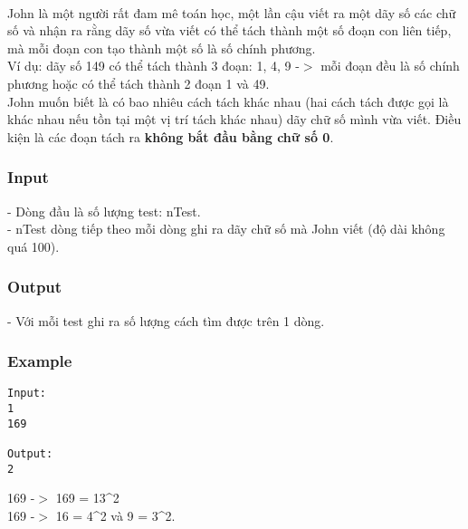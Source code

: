 

 

John là một người rất đam mê toán học, một lần cậu viết ra một dãy số các chữ số và nhận ra rằng dãy số vừa viết có thể tách thành một số đoạn con liên tiếp, mà mỗi đoạn con tạo thành một số là số chính phương.
\\Ví dụ: dãy số 149 có thể tách thành 3 đoạn: 1, 4, 9 -$>$ mỗi đoạn đều là số chính phương hoặc có thể tách thành 2 đoạn 1 và 49.
\\John muốn biết là có bao nhiêu cách tách khác nhau (hai cách tách được gọi là khác nhau nếu tồn tại một vị trí tách khác nhau) dãy chữ số mình vừa viết. Điều kiện là các đoạn tách ra \textbf{không bắt đầu bằng chữ số 0}.

\subsubsection{Input}

- Dòng đầu là số lượng test: nTest.
\\- nTest dòng tiếp theo mỗi dòng ghi ra dãy chữ số mà John viết (độ dài không quá 100).

\subsubsection{Output}

- Với mỗi test ghi ra số lượng cách tìm được trên 1 dòng.

\subsubsection{Example}
\begin{verbatim}
Input:
1
169

Output:
2
\end{verbatim}

169 -$>$ 169 = 13^2
\\169 -$>$ 16 = 4^2 và 9 = 3^2.
